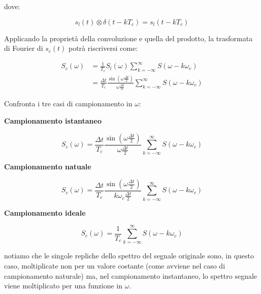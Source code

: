 dove: 

{
    \Large 
    \begin{equation}
        s_l (t) \otimes \delta(t - kT_c) = s_l (t - kT_c)
    \end{equation}
}

Applicando la proprietà della convoluzione e quella del prodotto, la trasformata di Fourier 
di $s_c (t)$ potrà riscriversi come: 

{
    \Large 
    \begin{equation}
        \begin{split}
            S_c (\omega) 
            &=
            \frac{1}{T_c} S_l (\omega) 
            \sum_{k = - \infty}^{\infty} 
            S(\omega -k \omega_c) 
            \\ 
            &=
            \frac{\Delta t}{T_c} 
            \frac{\sin(\omega \frac{\Delta t}{2})}{\omega \frac{\Delta t}{2}} 
            \sum_{k = -\infty}^{\infty} 
            S(\omega - k\omega_c)
        \end{split}
    \end{equation}
}

Confronta i tre casi di campionamento in $\omega$: \newline 

\textbf{Campionamento istantaneo}

{
    \Large 
    \begin{equation}
        S_c (\omega) = 
        \frac{\Delta t}{T_c} 
        \frac{\sin(\omega \frac{\Delta t}{2})}{\omega \frac{\Delta t}{2}} 
        \sum_{k = -\infty}^{\infty} 
        S(\omega - k\omega_c)
    \end{equation}
}

\textbf{Campionamento natuale}

{
    \Large 
    \begin{equation}
        S_c (\omega) = 
        \frac{\Delta t}{T_c} 
        \frac{\sin(\omega \frac{\Delta t}{2})}{k \omega_c \frac{\Delta t}{2}} 
        \sum_{k = -\infty}^{\infty} 
        S(\omega - k\omega_c)
    \end{equation}
}

\textbf{Campionamento ideale} 

{
    \Large 
    \begin{equation}
        S_c (\omega) = 
        \frac{1}{T_c} 
        \sum_{k = -\infty}^{\infty}
        S(\omega - k\omega_c)
    \end{equation}
}

notiamo che le singole repliche dello spettro del segnale originale sono, 
in questo caso, moltiplicate non per un valore costante (come avviene nel caso di campionamento naturale) 
ma, nel campionamento instantaneo, lo spettro segnale viene moltiplicato per una funzione in $\omega$. \newline 

